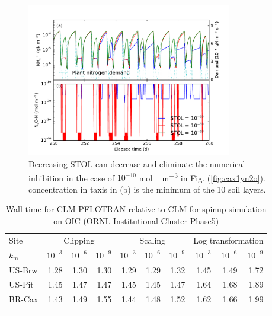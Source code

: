 \documentclass[gmd, manuscript]{copernicus}
\begin{document}
\begin{figure}[t]
\includegraphics[width=0.8\textwidth]{../figs/fig19/cax1yn2ostol0.pdf}
\caption{Decreasing STOL can decrease and eliminate the numerical inhibition in the case of $10^{-10}$  \unit{mol\,m^{-3}}  in Fig. (\ref{fig:cax1yn2o}).  concentration in taxis in (b) is the minimum of the 10 soil layers.}
\label{fig:cax1yn2osto0}
\end{figure}

\clearpage

\begin{table}[t]
\caption{Wall time for CLM-PFLOTRAN relative to CLM for spinup simulation on OIC (ORNL Institutional Cluster Phase5)}
\label{tab:computingtime}
\begin{tabular}{lrrrrrrrrr}
\tophline
Site & \multicolumn{3}{c}{Clipping}  & \multicolumn{3}{c}{Scaling} & \multicolumn{3}{c}{Log transformation} \\
\middlehline
$k_\text{m}$ & $10^{-3}$ & $10^{-6}$ & $10^{-9}$ &  $10^{-3}$ & $10^{-6}$ & $10^{-9}$ & $10^{-3}$ & $10^{-6}$ & $10^{-9}$\\
\middlehline
US-Brw & 1.28	& 1.30 &	1.30	& 1.29	& 1.29	& 1.32	& 1.45	& 1.49	& 1.72 \\
US-Pit   & 1.45	& 1.47 &	1.47	& 1.45	& 1.45	& 1.47	& 1.64	& 1.68	& 1.89 \\
BR-Cax & 1.43	& 1.49 &	1.55	& 1.44	& 1.48	& 1.52	& 1.62	& 1.66	& 1.99 \\
\bottomhline
\end{tabular}
\end{table}


\clearpage
\end{document}

